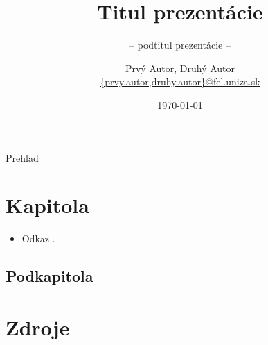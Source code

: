 \documentclass[10pt,t]{beamer}
\title{Titul prezentácie}
\subtitle{-- podtitul prezentácie --}  %
\date{\today}
\author{
  Prvý Autor, Druhý Autor \\
  \url{{prvy.autor,druhy.autor}@fel.uniza.sk} \\
}
\institute[UNIZA] %
{%
  Názov fakulty / katedry \\[0.75em]
  \textsc{Žilinská univerzita}
}
\begin{document}
{\introbg%
\begin{frame} %

\renewcommand{\titletextcolwidth}{0.6\textwidth}
\renewcommand{\titleimagecolwidth}{0.4\textwidth}

  \titlepage
\end{frame}}

\begin{frame}{Prehľad}
\tableofcontents
\end{frame}

\section{Kapitola}

\begin{frame}{\secname}
\begin{itemize}
\item Odkaz \cite{Ackley1985}.
\end{itemize}
\end{frame}

\subsection{Podkapitola}

\begin{frame}{\subsecname}{\secname}


\end{frame}


\section{Zdroje}

\begin{frame}[allowframebreaks]{\secname}
\printbibliography[title={Zoznam použitej literatúry}]
\end{frame}
\end{document}
